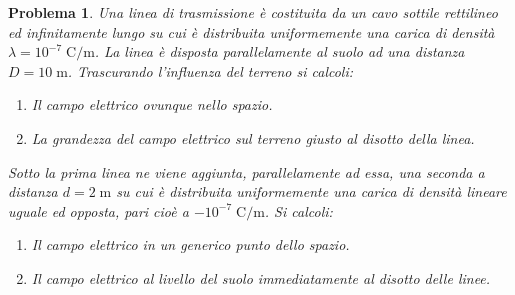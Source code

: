 \documentclass[a4paper,oneside]{article}
\newtheorem{problema}{Problema}
\begin{document}
\begin{problema}
	Una linea di trasmissione è costituita da un cavo sottile
	rettilineo ed infinitamente lungo su cui è distribuita
	uniformemente una carica di densità $\lambda = 10^{-7} \; \mathrm{C/m}$.
	La linea è disposta parallelamente al suolo ad una distanza
	$D = 10 \; \mathrm{m}$.
	Trascurando l'influenza del terreno si calcoli:
	\begin{enumerate}
		\item Il campo elettrico ovunque nello spazio.
		\item La grandezza del campo elettrico sul terreno giusto
		al disotto della linea.
	\end{enumerate}
	Sotto la prima linea ne viene aggiunta, parallelamente ad essa, 
	una seconda a distanza $d = 2 \; \mathrm{m}$ su cui è
	distribuita uniformemente una carica di densità lineare uguale ed opposta, 
	pari cioè a $-10^{-7} \; \mathrm{C/m}$. Si calcoli:
	\begin{enumerate}[start=3]
		\item Il campo elettrico in un generico punto dello spazio.
		\item Il campo elettrico al livello del suolo immediatamente 
		al disotto delle linee.
	\end{enumerate}
\end{problema}
\end{document}
